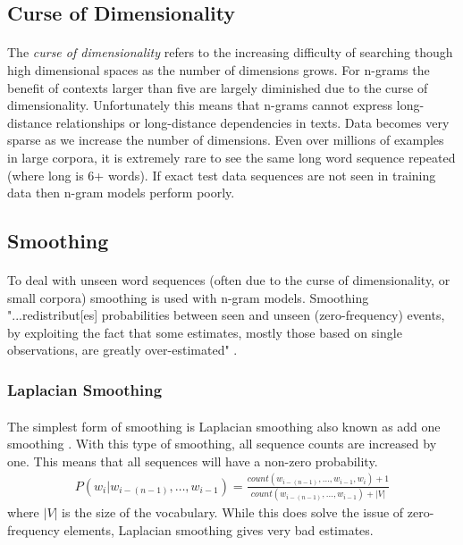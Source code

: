 \subsection{Curse of Dimensionality}
\paragraph{}
The \emph{curse of dimensionality} refers to the increasing difficulty of searching though high dimensional spaces as the number of dimensions grows. For n-grams the benefit of contexts larger than five are largely diminished due to the curse of dimensionality. Unfortunately this means that n-grams cannot express long-distance relationships or long-distance dependencies in texts. Data becomes very sparse as we increase the number of dimensions. Even over millions of examples in large corpora, it is extremely rare to see the same long word sequence repeated (where long is 6+ words). If exact test data sequences are not seen in training data then n-gram models perform poorly.
\subsection{Smoothing}
\paragraph{}
To deal with unseen word sequences (often due to the curse of dimensionality, or small corpora) smoothing is used with n-gram models. Smoothing "...redistribut[es] probabilities between seen and unseen (zero-frequency) events, by
exploiting the fact that some estimates, mostly those based on single observations, are greatly over-estimated" \cite[pg. 16]{Mikolov2012}.
\subsubsection{Laplacian Smoothing}
\paragraph{}
The simplest form of smoothing is Laplacian smoothing also known as add one smoothing \cite{Jurafsky2009}. With this type of smoothing, all sequence counts are increased by one. This means that all sequences will have a non-zero probability. 
\begin{align}
P(w_i | w_{i-(n-1)},\dots, w_{i-1}) = \frac{count(w_{i-(n-1)},\dots,w_{i-1},w_i)+1}{count(w_{i-(n-1)},\dots,w_{i-1})+|V|}
\end{align}
where $|V|$ is the size of the vocabulary. While this does solve the issue of zero-frequency elements, Laplacian smoothing gives very bad estimates. 
